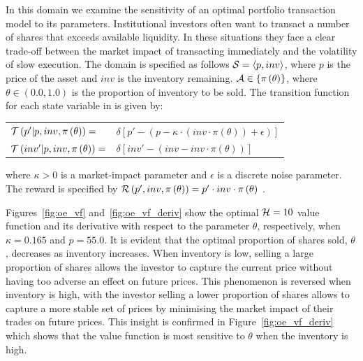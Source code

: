 In this domain we examine the sensitivity of an optimal portfolio transaction model to its parameters. Institutional investors often want to transact a number of shares that exceeds available liquidity. In these situations they face a clear trade-off between the market impact of transacting immediately and the volatility of slow execution. The domain is specified as follows {\footnotesize $ \mathcal{S} = \left\langle p, inv \right\rangle$}, where $ p $ is the price of the asset and $ inv $ is the inventory remaining. {\footnotesize $ \mathcal{A} \in \left\lbrace \pi\left( \theta \right) \right\rbrace$}, where {\footnotesize $ \theta \in \left( 0.0, 1.0\right)$} is the proportion of inventory to be sold. The transition function {\footnotesize \Transition} for each state variable in {\footnotesize \State} is given by:
{\footnotesize 
    \abovedisplayskip=5pt
    \belowdisplayskip=0pt
    \renewcommand{\arraystretch}{1.5}
    \begin{tabular}{ll}
        $\mathcal{T}\left( p' | p, inv, \pi\left( \theta \right) \right) = $ & $\delta \left[ p' - (p - \kappa \cdot (inv \cdot \pi\left( \theta \right)) + \epsilon) \right] $ \\
        $\mathcal{T}\left( inv' | p, inv, \pi\left( \theta \right) \right) = $ & $\delta \left[ inv' - (inv - inv \cdot \pi\left( \theta \right)) \right] $ \\
    \end{tabular}
}%
where {\footnotesize $ \kappa > 0$} is a market-impact parameter and {\footnotesize $ \epsilon $} is a discrete noise parameter. The reward is specified by {\footnotesize $ \mathcal{R}\left(p', inv, \pi\left( \theta \right) \right) = p' \cdot inv \cdot \pi\left( \theta \right)$ }. 

Figures~\ref{fig:oe_vf} and~\ref{fig:oe_vf_deriv} show the optimal {\footnotesize $ \mathcal{H} = 10 $} value function and its derivative with respect to the parameter {\footnotesize $ \theta  $}, respectively, when {\footnotesize $ \kappa = 0.165 $} and {\footnotesize $ p = 55.0 $}. It is evident that the optimal proportion of shares sold, {\footnotesize $ \theta $}, decreases as inventory increases. When inventory is low, selling a large proportion of shares allows the investor to capture the current price without having too adverse an effect on future prices. This phenomenon is reversed when inventory is high, with the investor selling a lower proportion of shares allows to capture a more stable set of prices by minimising the market impact of their trades on future prices. This insight is confirmed in Figure~\ref{fig:oe_vf_deriv} which shows that the value function is most sensitive to {\footnotesize $ \theta $} when the inventory is high.

